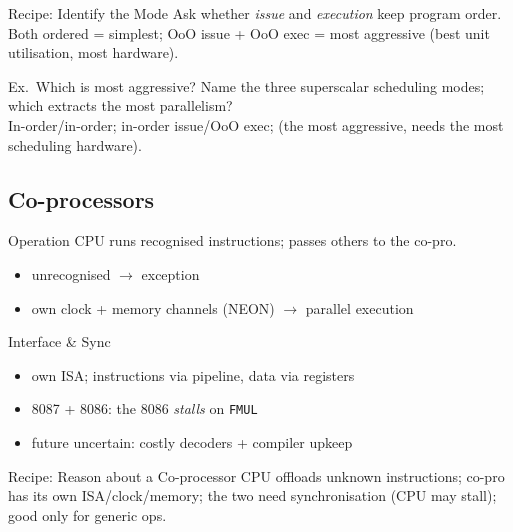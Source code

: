 \begin{KR}{Recipe: Identify the Mode}
    Ask whether \emph{issue} and \emph{execution} keep program order. Both ordered = simplest; OoO issue + OoO exec = most aggressive (best unit utilisation, most hardware).
\end{KR}

\multend

\begin{example2}{Ex.\ Which is most aggressive?}
    Name the three superscalar scheduling modes; which extracts the most parallelism?
     \\ 
    In-order/in-order; in-order issue/OoO exec;  (the most aggressive, needs the most scheduling hardware).
\end{example2}

\subsection{Co-processors}


\begin{definition}{Operation}
    CPU runs recognised instructions; passes others to the co-pro.
    \begin{itemize}
        \item unrecognised $\to$ exception
        \item own clock + memory channels (NEON) $\to$ parallel execution
    \end{itemize}
\end{definition}

\begin{concept}{Interface \& Sync}
    \begin{itemize}
        \item own ISA; instructions via pipeline, data via registers
        \item 8087 + 8086: the 8086 \emph{stalls} on \texttt{FMUL}
        \item future uncertain: costly decoders + compiler upkeep
    \end{itemize}
\end{concept}

\multend

\begin{KR}{Recipe: Reason about a Co-processor}
    CPU offloads unknown instructions; co-pro has its own ISA/clock/memory; the two need synchronisation (CPU may stall); good only for generic ops.
\end{KR}

